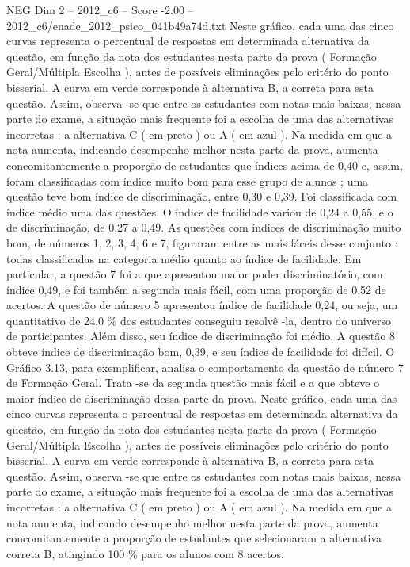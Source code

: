 \begin{textsample}{NEG Dim 2 – 2012\_c6 – Score -2.00 – 2012\_c6/enade\_2012\_psico\_041b49a74d.txt}
Neste gráfico, cada uma das cinco curvas representa o percentual de respostas em determinada alternativa da questão, em função da nota dos estudantes nesta parte da prova ( Formação Geral/Múltipla Escolha ), antes de possíveis eliminações pelo critério do ponto bisserial.
A curva em verde corresponde à alternativa B, a correta para esta questão.
Assim, observa -se que entre os estudantes com notas mais baixas, nessa parte do exame, a situação mais frequente foi a escolha de uma das alternativas incorretas : a alternativa C ( em preto ) ou A ( em azul ).
Na medida em que a nota aumenta, indicando desempenho melhor nesta parte da prova, aumenta concomitantemente a proporção de estudantes que índices acima de 0,40 e, assim, foram classificadas com índice muito bom para esse grupo de alunos ; uma questão teve bom índice de discriminação, entre 0,30 e 0,39.
Foi classificada com índice médio uma das questões.
O índice de facilidade variou de 0,24 a 0,55, e o de discriminação, de 0,27 a 0,49.
As questões com índices de discriminação muito bom, de números 1, 2, 3, 4, 6 e 7, figuraram entre as mais fáceis desse conjunto : todas classificadas na categoria médio quanto ao índice de facilidade.
Em particular, a questão 7 foi a que apresentou maior poder discriminatório, com índice 0,49, e foi também a segunda mais fácil, com uma proporção de 0,52 de acertos.
A questão de número 5 apresentou índice de facilidade 0,24, ou seja, um quantitativo de 24,0 \% dos estudantes conseguiu resolvê -la, dentro do universo de participantes.
Além disso, seu índice de discriminação foi médio.
A questão 8 obteve índice de discriminação bom, 0,39, e seu índice de facilidade foi difícil.
O Gráfico 3.13, para exemplificar, analisa o comportamento da questão de número 7 de Formação Geral.
Trata -se da segunda questão mais fácil e a que obteve o maior índice de discriminação dessa parte da prova.
Neste gráfico, cada uma das cinco curvas representa o percentual de respostas em determinada alternativa da questão, em função da nota dos estudantes nesta parte da prova ( Formação Geral/Múltipla Escolha ), antes de possíveis eliminações pelo critério do ponto bisserial.
A curva em verde corresponde à alternativa B, a correta para esta questão.
Assim, observa -se que entre os estudantes com notas mais baixas, nessa parte do exame, a situação mais frequente foi a escolha de uma das alternativas incorretas : a alternativa C ( em preto ) ou A ( em azul ).
Na medida em que a nota aumenta, indicando desempenho melhor nesta parte da prova, aumenta concomitantemente a proporção de estudantes que selecionaram a alternativa correta B, atingindo 100 \% para os alunos com 8 acertos.

\end{textsample}
